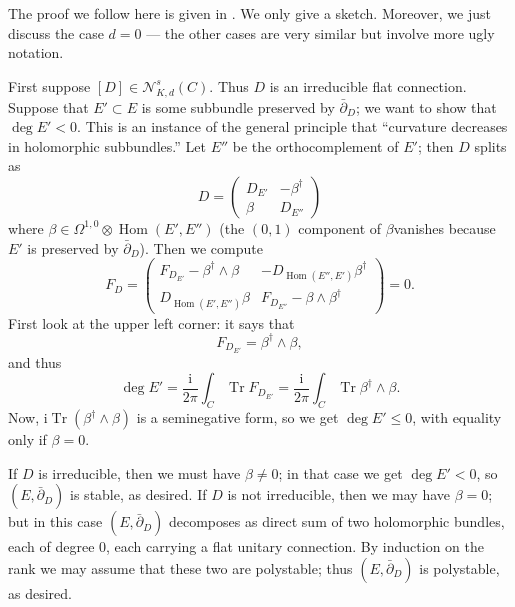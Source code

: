 \documentclass[12pt,letterpaper,reqno]{article}
\numberwithin{equation}{section}
\newcommand{\cN}{\ensuremath{\mathcal N}}
\newcommand{\I}{{\mathrm i}}
\DeclareMathOperator{\Tr}{Tr}
\DeclareMathOperator{\Hom}{Hom}
\begin{document}
\begin{pf} The proof we follow here is given in \cite{MR710055}.
We only give a sketch.
Moreover, we just discuss the case $d=0$ --- the other cases are
very similar but involve more ugly notation.

First suppose $[D] \in \cN^s_{K,d}(C)$. Thus $D$
is an irreducible flat connection. Suppose that $E' \subset E$ is some
subbundle preserved by $\bar\partial_D$; we want to show that $\deg E' < 0$.
This is an instance of the general principle that ``curvature decreases
in holomorphic subbundles.''
Let $E''$ be the orthocomplement of $E'$; then $D$ splits as
\begin{equation} \label{eq:connection-split}
  D = \begin{pmatrix} D_{E'} & - \beta^\dagger \\ \beta & D_{E''} \end{pmatrix}
\end{equation}
where $\beta \in \Omega^{1,0} \otimes \Hom(E',E'')$ (the $(0,1)$ component
of $\beta $vanishes because $E'$ is preserved by $\bar\partial_D$).
Then we compute
\begin{equation} \label{eq:extension-curvature}
  F_D = \begin{pmatrix} F_{D_{E'}} - \beta^\dagger \wedge \beta & - D_{\Hom(E'',E')} \beta^\dagger \\ D_{\Hom(E',E'')} \beta & F_{D_{E''}} - \beta \wedge \beta^\dagger \end{pmatrix} = 0.
\end{equation}
First look at the upper left corner: it says that
\begin{equation}
  F_{D_{E'}} = \beta^\dagger \wedge \beta,
\end{equation}
and thus
\begin{equation}
 \deg E' = \frac{\I}{2 \pi} \int_C \Tr F_{D_{E'}} = \frac{\I}{2 \pi} \int_C \Tr \beta^\dagger \wedge \beta.
\end{equation}
Now, $\I \Tr (\beta^\dagger \wedge \beta)$ is a seminegative form,
so we get $\deg E' \le 0$, with equality only if $\beta = 0$.

If $D$ is irreducible, then
we must have $\beta \neq 0$; in that case we get $\deg E' < 0$,
so $(E,\bar\partial_D)$ is stable, as desired.
If $D$ is not irreducible, then we may have $\beta = 0$;
but in this case $(E,\bar\partial_D)$ decomposes as direct sum
of two holomorphic bundles, each of degree $0$, each carrying a
flat unitary connection. By induction on the rank we may assume
that these two are polystable; thus
$(E,\bar\partial_D)$ is polystable, as desired.


\end{pf}
\end{document}
